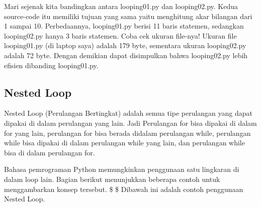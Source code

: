 Mari sejenak kita bandingkan antara looping01.py dan looping02.py. Kedua source-code itu memiliki tujuan yang sama yaitu menghitung akar bilangan dari 1 sampai 10. Perbedaannya, looping01.py berisi 11 baris statemen, sedangkan looping02.py hanya 3 baris statemen. Coba cek
ukuran file-nya! Ukuran file looping01.py (di laptop saya) adalah 179 byte, sementara ukuran looping02.py adalah 72 byte. Dengan demikian dapat disimpulkan bahwa looping02.py lebih efisien dibanding looping01.py.\cite{suparno2013komputasi}

\subsection{Nested Loop}
Nested Loop (Perulangan Bertingkat) adalah semua tipe perulangan yang dapat dipakai di dalam perulangan yang lain. Jadi Perulangan for bisa dipakai di dalam for yang lain, perulangan for bisa berada didalam perulangan while, perulangan while bisa dipakai di dalam perulangan while yang lain, dan perulangan while bisa di dalam perulangan for. \par
\vspace{12pt}
Bahasa pemrograman Python memungkinkan penggunaan satu lingkaran di dalam loop lain. Bagian berikut menunjukkan beberapa contoh untuk menggambarkan konsep tersebut. \$  \$\vspace{\baselineskip}
\vspace{\baselineskip}
Dibawah ini adalah contoh penggunaan Nested Loop. \par

